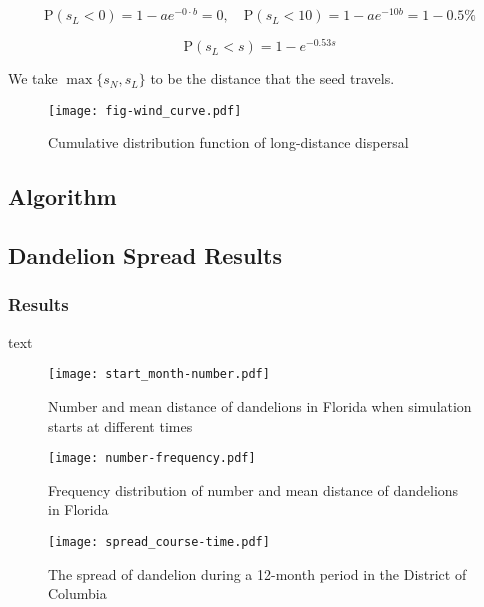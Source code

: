 \documentclass[12pt]{article}
\begin{document}
		\begin{equation}
			\mathrm{P} (s_L < 0) = 1 - ae^{-0 \cdot b} = 0, \quad \mathrm{P} (s_L < 10) = 1 - ae^{- 10 b} = 1 - 0.5\%
		\end{equation}
		
		\begin{equation}
			\mathrm{P} (s_L < s) = 1 - e^{-0.53 s}
		\end{equation}
		
		We take $\max\{s_N, s_L\}$ to be the distance that the seed travels.
		
		\begin{figure}
			\centering
			\texttt{[image: fig-wind\_curve.pdf]}
			\caption{Cumulative distribution function of long-distance dispersal}
			\label{fig:longDistance}
		\end{figure}
		
	\subsection{Algorithm}
	
	\subsection{Dandelion Spread Results}
	
		\subsubsection{Results}
		
			text
			
			\begin{figure}
				\centering
				\texttt{[image: start\_month-number.pdf]}
				\caption{Number and mean distance of dandelions in Florida when simulation starts at different times}
				\label{fig:start}
			\end{figure}
			
			\begin{figure}
				\centering
				\texttt{[image: number-frequency.pdf]}
				\caption{Frequency distribution of number and mean distance of dandelions in Florida}
				\label{fig:freqDand}
			\end{figure}
			
			
			\begin{figure}
				\centering
				\texttt{[image: spread\_course-time.pdf]}
				\caption{The spread of dandelion during a 12-month period in the District of Columbia}
				\label{fig:spreadDC}
			\end{figure}
			
\end{document}
